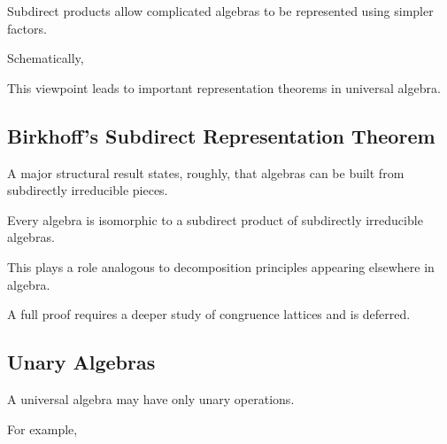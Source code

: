 Subdirect products allow complicated algebras to be represented using
simpler factors.

Schematically,

\begin{center}
\end{center}

This viewpoint leads to important representation theorems in universal
algebra.

\subsection{Birkhoff's Subdirect Representation Theorem}
\label{subsec:birkhoff-subdirect}

A major structural result states, roughly, that algebras can be built from
subdirectly irreducible pieces.

\begin{theorem}
Every algebra is isomorphic to a subdirect product of subdirectly
irreducible algebras.
\end{theorem}

This plays a role analogous to decomposition principles appearing elsewhere
in algebra.

A full proof requires a deeper study of congruence lattices and is deferred.

\subsection{Unary Algebras}
\label{subsec:unary-algebras}

A universal algebra may have only unary operations.

For example,

